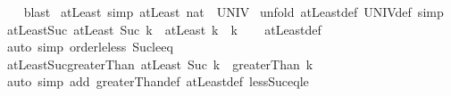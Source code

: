 \begin{isabellebody}
%
\isadelimproof
\ \ %
\endisadelimproof
%
\isatagproof
{}\isamarkupfalse%
\ blast%
\endisatagproof
{\isafoldproof}%
%
\isadelimproof
%
\endisadelimproof
%
\isadelimdocument
%
\endisadelimdocument
%
\isatagdocument
%
\isamarkuptrue%
%
\endisatagdocument
{\isafolddocument}%
%
\isadelimdocument
%
\endisadelimdocument
{}\isamarkupfalse%
\ atLeast{\isacharunderscore}{\kern0pt}{}\ {\isacharbrackleft}{\kern0pt}simp{\isacharbrackright}{\kern0pt}{\isacharcolon}{\kern0pt}\ {\isachardoublequoteopen}atLeast\ {\isacharparenleft}{\kern0pt}{}{\isacharcolon}{\kern0pt}{\isacharcolon}{\kern0pt}nat{\isacharparenright}{\kern0pt}\ {\isacharequal}{\kern0pt}\ UNIV{\isachardoublequoteclose}\isanewline
%
\isadelimproof
%
\endisadelimproof
%
\isatagproof
{}\isamarkupfalse%
\ {\isacharparenleft}{\kern0pt}unfold\ atLeast{\isacharunderscore}{\kern0pt}def\ UNIV{\isacharunderscore}{\kern0pt}def{\isacharcomma}{\kern0pt}\ simp{\isacharparenright}{\kern0pt}%
\endisatagproof
{\isafoldproof}%
%
\isadelimproof
\isanewline
%
\endisadelimproof
\isanewline
{}\isamarkupfalse%
\ atLeast{\isacharunderscore}{\kern0pt}Suc{\isacharcolon}{\kern0pt}\ {\isachardoublequoteopen}atLeast\ {\isacharparenleft}{\kern0pt}Suc\ k{\isacharparenright}{\kern0pt}\ {\isacharequal}{\kern0pt}\ atLeast\ k\ {\isacharminus}{\kern0pt}\ {\isacharbraceleft}{\kern0pt}k{\isacharbraceright}{\kern0pt}{\isachardoublequoteclose}\isanewline
%
\isadelimproof
\ \ %
\endisadelimproof
%
\isatagproof
{}\isamarkupfalse%
\ atLeast{\isacharunderscore}{\kern0pt}def\ \isamarkupfalse%
\ {\isacharparenleft}{\kern0pt}auto\ simp{\isacharcolon}{\kern0pt}\ order{\isacharunderscore}{\kern0pt}le{\isacharunderscore}{\kern0pt}less\ Suc{\isacharunderscore}{\kern0pt}le{\isacharunderscore}{\kern0pt}eq{\isacharparenright}{\kern0pt}%
\endisatagproof
{\isafoldproof}%
%
\isadelimproof
\isanewline
%
\endisadelimproof
\isanewline
{}\isamarkupfalse%
\ atLeast{\isacharunderscore}{\kern0pt}Suc{\isacharunderscore}{\kern0pt}greaterThan{\isacharcolon}{\kern0pt}\ {\isachardoublequoteopen}atLeast\ {\isacharparenleft}{\kern0pt}Suc\ k{\isacharparenright}{\kern0pt}\ {\isacharequal}{\kern0pt}\ greaterThan\ k{\isachardoublequoteclose}\isanewline
%
\isadelimproof
\ \ %
\endisadelimproof
%
\isatagproof
{}\isamarkupfalse%
\ {\isacharparenleft}{\kern0pt}auto\ simp\ add{\isacharcolon}{\kern0pt}\ greaterThan{\isacharunderscore}{\kern0pt}def\ atLeast{\isacharunderscore}{\kern0pt}def\ less{\isacharunderscore}{\kern0pt}Suc{\isacharunderscore}{\kern0pt}eq{\isacharunderscore}{\kern0pt}le{\isacharparenright}{\kern0pt}%

\end{isabellebody}
